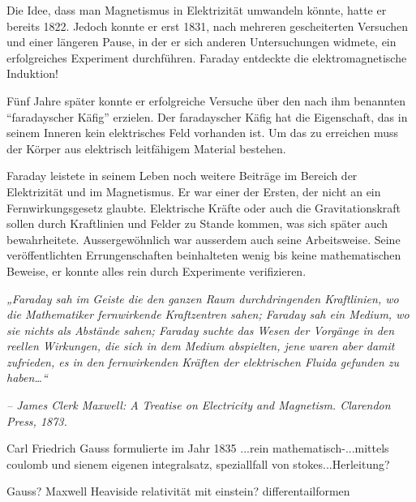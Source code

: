 Die Idee, dass man Magnetismus in Elektrizität umwandeln könnte, hatte er bereits 1822.
Jedoch konnte er erst 1831, nach mehreren gescheiterten Versuchen und einer längeren Pause, in der er sich anderen Untersuchungen widmete, ein erfolgreiches Experiment durchführen.
Faraday entdeckte die elektromagnetische Induktion!


Fünf Jahre später konnte er erfolgreiche Versuche über den nach ihm benannten ``faradayscher Käfig'' erzielen.
Der faradayscher Käfig hat die Eigenschaft, das in seinem Inneren kein elektrisches Feld vorhanden ist.
Um das zu erreichen muss der Körper aus elektrisch leitfähigem Material bestehen.


Faraday leistete in seinem Leben noch weitere Beiträge im Bereich der Elektrizität und im Magnetismus. 
Er war einer der Ersten, der nicht an ein Fernwirkungsgesetz glaubte.
Elektrische Kräfte oder auch die Gravitationskraft sollen durch Kraftlinien und Felder zu Stande kommen, was sich später auch bewahrheitete.
Aussergewöhnlich war ausserdem auch seine Arbeitsweise.
Seine veröffentlichten Errungenschaften beinhalteten wenig bis keine mathematischen Beweise, er konnte alles rein durch Experimente verifizieren.


\textit{„Faraday sah im Geiste die den ganzen Raum durchdringenden Kraftlinien, wo die Mathematiker fernwirkende Kraftzentren sahen; Faraday sah ein Medium, wo sie nichts als Abstände sahen; Faraday suchte das Wesen der Vorgänge in den reellen Wirkungen, die sich in dem Medium abspielten, jene waren aber damit zufrieden, es in den fernwirkenden Kräften der elektrischen Fluida gefunden zu haben…“}


\textit{– James Clerk Maxwell: A Treatise on Electricity and Magnetism. Clarendon Press, 1873.}


Carl Friedrich Gauss formulierte im Jahr 1835 ...rein mathematisch-...mittels coulomb und sienem eigenen integralsatz, speziallfall von stokes...Herleitung?








Gauss?
Maxwell
Heaviside
relativität mit einstein?
differentailformen

